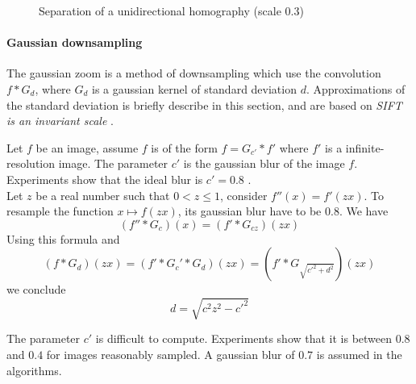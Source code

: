 \begin{figure}[h!]
\caption{Separation of a unidirectional homography (scale $0.3$) }
\label{image_separation_f14}
\end{figure}

\paragraph{Gaussian downsampling}
\label{zoom_gaussien}
The gaussian zoom is a method of downsampling which use the convolution $f*G_{d}$, where $G_d$ is a gaussian kernel of standard deviation $d$. Approximations of the standard deviation is briefly describe in this section, and are based on  \emph{SIFT is an invariant scale} \cite{morel2011sift}.


Let $f$ be an image, assume $f$ is of the form $f=G_{c'} * f'$ where $f'$ is a infinite-resolution image. The parameter $c'$ is the gaussian blur of the image $f$. Experiments show that the ideal blur is $c'=0.8$ \cite{morel2011sift}.\\
Let $z$ be a real number such that $0<z\le 1$, consider $f''(x)=f'(zx)$. To resample the function $x\mapsto f(zx)$, its gaussian blur have to be $0.8$. We have
\begin{equation*}
(f''*G_{c})(x)=(f'*G_{cz})(zx)
\end{equation*}
Using this formula and 
\begin{equation*}
(f*G_d)(zx)=(f'*G_c'*G_d)(zx)=(f'*G_{\sqrt{c'^2 + d^2}})(zx)
\end{equation*}
we conclude
\begin{equation}
d=\sqrt{c^2 z^2 - c'^2}
\label{formule_zoom_gaussien}
\end{equation}

The parameter $c'$ is difficult to compute. Experiments show that it is between $0.8$ and $0.4$ for images reasonably sampled. A gaussian blur of $0.7$ is assumed in the algorithms.


